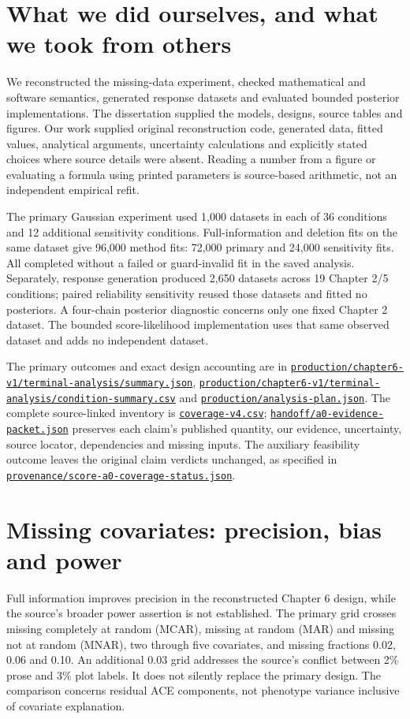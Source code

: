 \documentclass[11pt]{article}
\newcommand{\file}[1]{\href{https://github.com/alectionary/vibe-math/blob/master/formalization/schwabe-psychometric-genetics/#1}{\nolinkurl{#1}}}
\begin{document}
\section{What we did ourselves, and what we took from others}\label{sec:contribution}
We reconstructed the missing-data experiment, checked mathematical and software semantics, generated response datasets and evaluated bounded posterior implementations. The dissertation supplied the models, designs, source tables and figures. Our work supplied original reconstruction code, generated data, fitted values, analytical arguments, uncertainty calculations and explicitly stated choices where source details were absent. Reading a number from a figure or evaluating a formula using printed parameters is source-based arithmetic, not an independent empirical refit.

The primary Gaussian experiment used 1,000 datasets in each of 36 conditions and 12 additional sensitivity conditions. Full-information and deletion fits on the same dataset give 96,000 method fits: 72,000 primary and 24,000 sensitivity fits. All completed without a failed or guard-invalid fit in the saved analysis. Separately, response generation produced 2,650 datasets across 19 Chapter 2/5 conditions; paired reliability sensitivity reused those datasets and fitted no posteriors. A four-chain posterior diagnostic concerns only one fixed Chapter 2 dataset. The bounded score-likelihood implementation uses that same observed dataset and adds no independent dataset.

The primary outcomes and exact design accounting are in \file{production/chapter6-v1/terminal-analysis/summary.json}, \file{production/chapter6-v1/terminal-analysis/condition-summary.csv} and \file{production/analysis-plan.json}. The complete source-linked inventory is \file{coverage-v4.csv}; \file{handoff/a0-evidence-packet.json} preserves each claim's published quantity, our evidence, uncertainty, source locator, dependencies and missing inputs. The auxiliary feasibility outcome leaves the original claim verdicts unchanged, as specified in \file{provenance/score-a0-coverage-status.json}.

\section{Missing covariates: precision, bias and power}\label{sec:ch6}
Full information improves precision in the reconstructed Chapter 6 design, while the source's broader power assertion is not established. The primary grid crosses missing completely at random (MCAR), missing at random (MAR) and missing not at random (MNAR), two through five covariates, and missing fractions 0.02, 0.06 and 0.10. An additional 0.03 grid addresses the source's conflict between 2\% prose and 3\% plot labels. It does not silently replace the primary design. The comparison concerns residual ACE components, not phenotype variance inclusive of covariate explanation.
\end{document}
